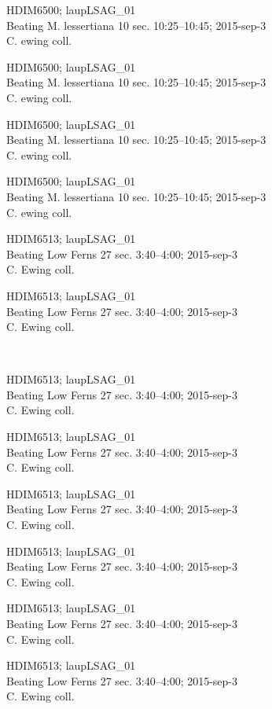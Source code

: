 \documentclass[2pt]{extarticle}
\begin{document}
\noindent
\parbox{0.16\textwidth}{\tiny \raggedright \rule[-0.3\baselineskip]{0pt}{10pt}HDIM6500; laupLSAG\_01\\ Beating M. lessertiana 10 sec. 10:25--10:45; 2015-sep-3\\ C. ewing coll.}
\parbox{0.16\textwidth}{\tiny \raggedright \rule[-0.3\baselineskip]{0pt}{10pt}HDIM6500; laupLSAG\_01\\ Beating M. lessertiana 10 sec. 10:25--10:45; 2015-sep-3\\ C. ewing coll.}
\parbox{0.16\textwidth}{\tiny \raggedright \rule[-0.3\baselineskip]{0pt}{10pt}HDIM6500; laupLSAG\_01\\ Beating M. lessertiana 10 sec. 10:25--10:45; 2015-sep-3\\ C. ewing coll.}
\parbox{0.16\textwidth}{\tiny \raggedright \rule[-0.3\baselineskip]{0pt}{10pt}HDIM6500; laupLSAG\_01\\ Beating M. lessertiana 10 sec. 10:25--10:45; 2015-sep-3\\ C. ewing coll.}
\parbox{0.16\textwidth}{\tiny \raggedright \rule[-0.3\baselineskip]{0pt}{10pt}HDIM6513; laupLSAG\_01\\ Beating Low Ferns 27 sec. 3:40--4:00; 2015-sep-3\\ C. Ewing coll.}
\parbox{0.16\textwidth}{\tiny \raggedright \rule[-0.3\baselineskip]{0pt}{10pt}HDIM6513; laupLSAG\_01\\ Beating Low Ferns 27 sec. 3:40--4:00; 2015-sep-3\\ C. Ewing coll.} \\ 
\vspace{0.001in} 

\noindent
\parbox{0.16\textwidth}{\tiny \raggedright \rule[-0.3\baselineskip]{0pt}{10pt}HDIM6513; laupLSAG\_01\\ Beating Low Ferns 27 sec. 3:40--4:00; 2015-sep-3\\ C. Ewing coll.}
\parbox{0.16\textwidth}{\tiny \raggedright \rule[-0.3\baselineskip]{0pt}{10pt}HDIM6513; laupLSAG\_01\\ Beating Low Ferns 27 sec. 3:40--4:00; 2015-sep-3\\ C. Ewing coll.}
\parbox{0.16\textwidth}{\tiny \raggedright \rule[-0.3\baselineskip]{0pt}{10pt}HDIM6513; laupLSAG\_01\\ Beating Low Ferns 27 sec. 3:40--4:00; 2015-sep-3\\ C. Ewing coll.}
\parbox{0.16\textwidth}{\tiny \raggedright \rule[-0.3\baselineskip]{0pt}{10pt}HDIM6513; laupLSAG\_01\\ Beating Low Ferns 27 sec. 3:40--4:00; 2015-sep-3\\ C. Ewing coll.}
\parbox{0.16\textwidth}{\tiny \raggedright \rule[-0.3\baselineskip]{0pt}{10pt}HDIM6513; laupLSAG\_01\\ Beating Low Ferns 27 sec. 3:40--4:00; 2015-sep-3\\ C. Ewing coll.}
\parbox{0.16\textwidth}{\tiny \raggedright \rule[-0.3\baselineskip]{0pt}{10pt}HDIM6513; laupLSAG\_01\\ Beating Low Ferns 27 sec. 3:40--4:00; 2015-sep-3\\ C. Ewing coll.} \\ 
\vspace{0.001in} 
\end{document}
